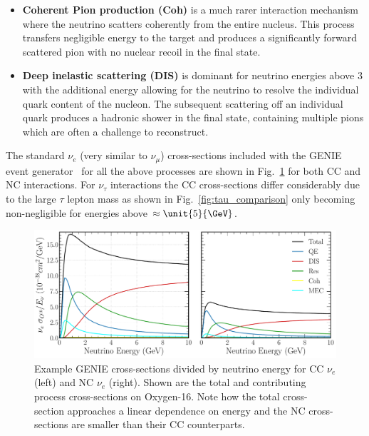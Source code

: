 \begin{itemize}
    \item \textbf{Coherent Pion production (Coh)} is a much rarer interaction mechanism where the
          neutrino scatters coherently from the entire nucleus. This process transfers negligible
          energy to the target and produces a significantly forward scattered pion with no nuclear
          recoil in the final state.

    \item \textbf{Deep inelastic scattering (DIS)} is dominant for neutrino energies above
          \unit{3}{\GeV} with the additional energy allowing for the neutrino to resolve the
          individual quark content of the nucleon. The subsequent scattering off an individual
          quark produces a hadronic shower in the final state, containing multiple pions which are
          often a challenge to reconstruct.
\end{itemize}

The standard $\nu_{e}$ (very similar to $\nu_{\mu}$) cross-sections included with the GENIE event
generator~\cite{andreopoulos2009, andreopoulos2015} for all the above processes are shown in
Fig.~\ref{fig:xsec_nu_e_O16} for both CC and NC interactions. For $\nu_{\tau}$ interactions the CC
cross-sections differ considerably due to the large $\tau$ lepton mass as shown in
Fig.~\ref{fig:tau_comparison} only becoming non-negligible for energies above
$\approx\unit{5}{\GeV}$.

\begin{figure} %
    \includegraphics[width=\textwidth]{diagrams/3-theory/xsec_nu_e_O16.pdf}
    \caption[$\nu_{e}$ GENIE cross-sections on Oxygen-16.]
    {Example GENIE cross-sections divided by neutrino energy for CC $\nu_{e}$ (left) and NC
        $\nu_{e}$ (right). Shown are the total and contributing process cross-sections on
        Oxygen-16. Note how the total cross-section approaches a linear dependence on energy and
        the NC cross-sections are smaller than their CC counterparts.}
    \label{fig:xsec_nu_e_O16}
\end{figure}

